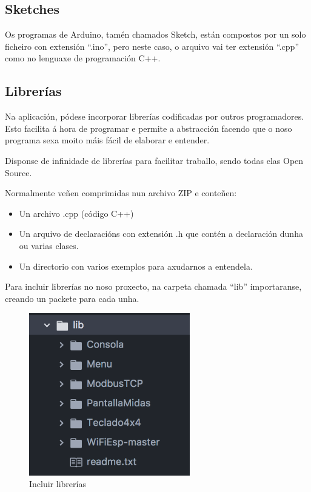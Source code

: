 \documentclass[11pt,twoside]{book}
\begin{document}
\subsection{Sketches}

Os programas de Arduino, tamén chamados Sketch, están compostos por un solo ficheiro con extensión ``.ino'', pero neste caso, o arquivo vai ter extensión ``.cpp'' como no lenguaxe de programación C++.

\subsection{Librerías}

Na aplicación, pódese incorporar librerías codificadas por outros programadores. Esto facilita á hora de programar e permite a abstracción facendo que o noso programa sexa moito máis fácil de elaborar e entender.

Disponse de infinidade de librerías para facilitar traballo, sendo todas elas Open Source.

Normalmente veñen comprimidas nun archivo ZIP e conteñen:
\begin{itemize}
\item Un archivo .cpp (código C++)
\item Un arquivo de declaracións con extensión .h que contén a declaración dunha ou varias clases.
\item Un directorio con varios exemplos para axudarnos a entendela.
\end{itemize}

Para incluir librerías no noso proxecto, na carpeta chamada ``lib'' importaranse, creando un packete para cada unha.

\begin{figure}[H]
	\begin{center}
		\includegraphics[width=7cm]{images/librerias.png}
	\end{center}
	\caption{Incluir librerías}
	\label{fig:LibreriasAtom}
\end{figure}
\end{document}

